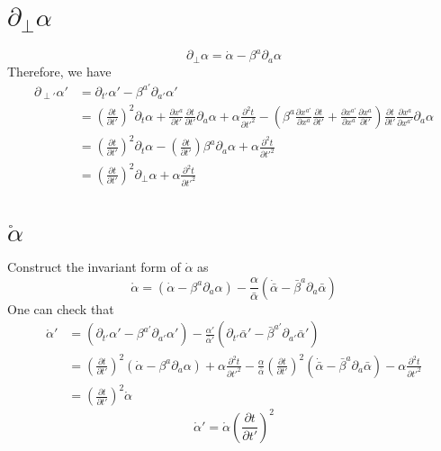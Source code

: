 \documentclass{article}
\begin{document}
\section{$\partial_{\perp}\alpha$}
\[
\partial_{\perp}\alpha = {\dot \alpha} - \beta^{a}\partial_{a}\alpha
\]
Therefore, we have
\begin{align*}
\partial_{\perp '}\alpha' & = \partial_{t'}\alpha' - \beta^{a'}\partial_{a'}\alpha'\\
& = (\frac{\partial t}{\partial t'})^{2}\partial_{t}\alpha + \frac{\partial x^{a}}{\partial t'}\frac{\partial t}{\partial t'}\partial_{a}\alpha + \alpha\frac{\partial^{2} t}{\partial t'^2} - (\beta^{a}\frac{\partial x^{a'}}{\partial x^{a}}\frac{\partial t}{\partial t'} + \frac{\partial x^{a'}}{\partial x^{a}}\frac{\partial x^{a}}{\partial t'}) \frac{\partial t}{\partial t'}\frac{\partial x^{a}}{\partial x^{a'}}\partial_{a}\alpha\\
& = (\frac{\partial t}{\partial t'})^{2}\partial_{t}\alpha - (\frac{\partial t}{\partial t'})\beta^{a}\partial_{a}\alpha+  \alpha\frac{\partial^{2} t}{\partial t'^2}\\
& = (\frac{\partial t}{\partial t'})^{2}\partial_{\perp}\alpha +  \alpha\frac{\partial^{2} t}{\partial t'^2}
\end{align*}
\section{$\mathring{\alpha}$}
Construct the invariant form of ${\dot \alpha}$ as
\[
\mathring{\alpha} = ({\dot \alpha} - \beta^{a}\partial_{a}\alpha) - \frac{\alpha}{{\bar \alpha}}({\dot {\bar \alpha}} - {\bar \beta}^{a}\partial_{a}{\bar \alpha})
\]
One can check that
\begin{align*}
\mathring{\alpha}'& = (\partial_{t'}\alpha' - \beta^{a'}\partial_{a'}\alpha') - \frac{\alpha'}{{\bar \alpha}'}(\partial_{t'}{\bar \alpha}' - {\bar \beta}^{a'}\partial_{a'}{\bar \alpha}')\\
& = (\frac{\partial t}{\partial t'})^{2}({\dot \alpha} - \beta^{a}\partial_{a}\alpha) + \alpha\frac{\partial^{2} t}{\partial t'^{2}} - \frac{\alpha}{{\bar \alpha}}(\frac{\partial t}{\partial t'})^{2}({\dot {\bar \alpha}} - {\bar \beta}^{a}\partial_{a}{\bar \alpha}) - \alpha\frac{\partial^{2} t}{\partial t'^{2}}\\
& = (\frac{\partial t}{\partial t'})^{2}\mathring{\alpha}
\end{align*}
{\color{red}
\[
\boxed{
\mathring{\alpha}' = \mathring{\alpha}(\frac{\partial t}{\partial t'})^{2}
}
\]
}
\end{document}
